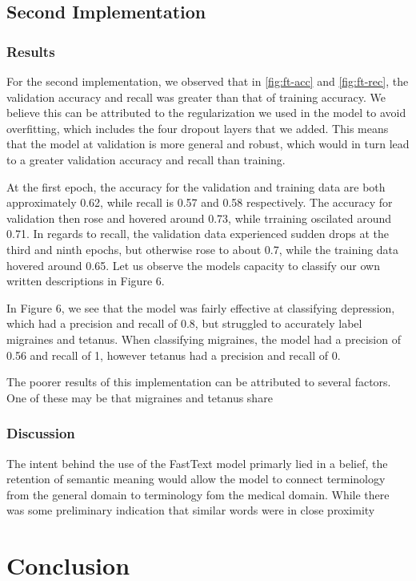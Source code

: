 \documentclass[12pt]{report}
\begin{document}
\section{Second Implementation}


\subsection{Results}

For the second implementation, we observed that in \ref{fig:ft-acc} and
\ref{fig:ft-rec}, the validation accuracy and
recall was greater than that of training accuracy. We believe this can be
attributed to the regularization we used in the model to avoid overfitting,
which includes the four dropout layers that we added. This means that the model
at validation is more general and robust, which would in turn lead to a greater
validation accuracy and recall than training.

At the first epoch, the accuracy for the validation and training data are both
approximately 0.62, while recall is 0.57 and 0.58 respectively. The accuracy
for validation then rose and hovered around 0.73, while trraining oscilated
around 0.71. In regards to recall, the validation data experienced sudden drops
at the third and ninth epochs, but otherwise rose to about 0.7, while the
training data hovered around 0.65. Let us observe the models capacity to classify
our own written descriptions in Figure 6.

In Figure 6, we see that the model was fairly effective at classifying
depression, which had a precision and recall of 0.8, but struggled to accurately
label migraines and tetanus. When classifying migraines, the model had a
precision of 0.56 and recall of 1, however tetanus had a precision and recall of
0.

The poorer results of this implementation can be attributed to several factors.
One of these may be that migraines and tetanus share

\subsection{Discussion}
The intent behind the use of the FastText model primarly lied in
a belief, the retention of semantic meaning would allow the
model to connect terminology from the general domain to
terminology fom the medical domain. While there was some preliminary
indication that similar words were in close proximity

\chapter{Conclusion}
\end{document}
